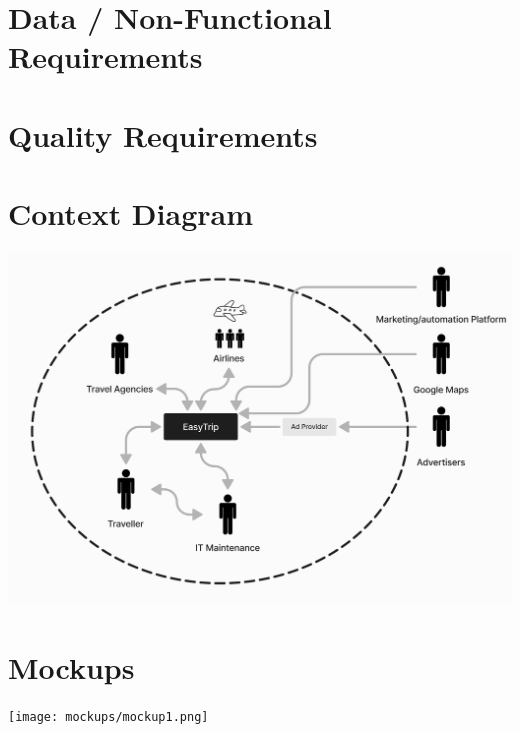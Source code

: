 \documentclass[a4paper]{article}
\begin{document}
\section{Data / Non-Functional Requirements}


\section{Quality Requirements}


\section{Context Diagram}
\includegraphics[width=.99\textwidth]{resources/contextDiagram.png}

\section{Mockups}
\texttt{[image: mockups/mockup1.png]}
\end{document}
